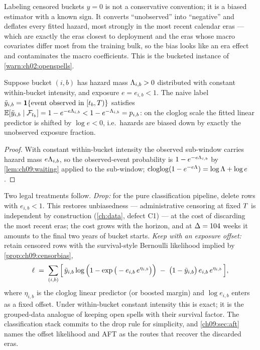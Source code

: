 \begin{warning}\label{warn:ch09:censorzero}
Labeling censored buckets $y=0$ is not a conservative convention; it is a
biased estimator with a known sign. It converts ``unobserved'' into
``negative'' and deflates every fitted hazard, most strongly in the most
recent calendar eras --- which are exactly the eras closest to deployment
and the eras whose macro covariates differ most from the training bulk,
so the bias looks like an era effect and contaminates the macro
coefficients. This is the bucketed instance of
\cref{warn:ch02:openspells}.
\end{warning}

\begin{proposition}\label{prop:ch09:censorbias}
Suppose bucket $(i,b)$ has hazard mass $\Lambda_{i,b} > 0$ distributed with
constant within-bucket intensity, and exposure $e = e_{i,b} < 1$. The
naive label $\tilde y_{i,b} = \mathbf{1}\{\text{event observed in }
[t_b, T)\}$ satisfies
$\mathbb{E}[\tilde y_{i,b} \mid \mathcal{F}_{t_b}] = 1 - e^{-e \Lambda_{i,b}}
< 1 - e^{-\Lambda_{i,b}} = p_{i,b}$:
on the cloglog scale the fitted linear predictor is shifted by
$\log e < 0$, i.e.\ hazards are biased down by exactly the unobserved
exposure fraction.
\end{proposition}

\begin{proof}
With constant within-bucket intensity the observed sub-window carries
hazard mass $e\Lambda_{i,b}$, so the observed-event probability is
$1 - e^{-e\Lambda_{i,b}}$ by \cref{lem:ch09:waiting} applied to the
sub-window; $\operatorname{cloglog}(1 - e^{-e\Lambda}) = \log \Lambda + \log e$.
\end{proof}

Two legal treatments follow. \emph{Drop:} for the pure classification
pipeline, delete rows with $e_{i,b} < 1$. This restores unbiasedness ---
administrative censoring at fixed $T$ is independent by construction
(\cref{ch:data}, defect C1) --- at the cost of discarding the most recent
eras; the cost grows with the horizon, and at $\Delta = 104$ weeks it
amounts to the final two years of bucket starts. \emph{Keep with an
exposure offset:} retain censored rows with the survival-style Bernoulli
likelihood implied by \cref{prop:ch09:censorbias},
\begin{equation}\label{eq:ch09:offsetlik}
\ell \;=\; \sum_{(i,b)} \Big[\, \tilde y_{i,b} \log\Big(1 -
\exp\big(-e_{i,b}\, e^{\eta_{i,b}}\big)\Big) \;-\; \big(1 -
\tilde y_{i,b}\big)\, e_{i,b}\, e^{\eta_{i,b}} \,\Big],
\end{equation}
where $\eta_{i,b}$ is the cloglog linear predictor (or boosted margin)
and $\log e_{i,b}$ enters as a fixed offset. Under within-bucket constant
intensity this is exact; it is the grouped-data analogue of keeping open
spells with their survival factor. The classification stack commits to
the drop rule for simplicity, and \cref{ch09:sec:aft} names the offset
likelihood and AFT as the routes that recover the discarded eras.


